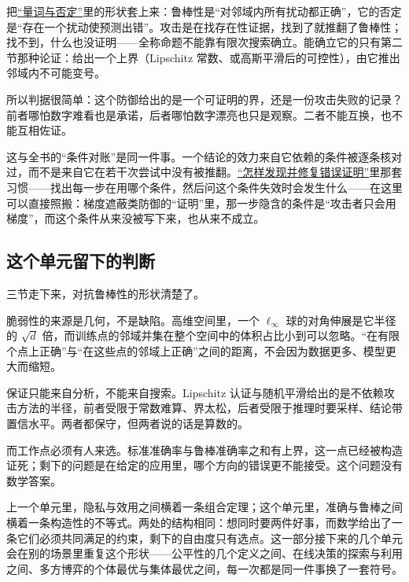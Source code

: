 \begin{proposition}[判断一个防御是否真实]
把\hyperref[sec:01-Mathematical-Language/01-Logic/03]{``量词与否定''}里的形状套上来：鲁棒性是``对邻域内所有扰动都正确''，它的否定是``存在一个扰动使预测出错''。攻击是在找存在性证据，找到了就推翻了鲁棒性；找不到，什么也没证明——全称命题不能靠有限次搜索确立。能确立它的只有第二节那种论证：给出一个上界（Lipschitz 常数、或高斯平滑后的可控性），由它推出邻域内不可能变号。
\end{proposition}

所以判据很简单：这个防御给出的是一个可证明的界，还是一份攻击失败的记录？前者哪怕数字难看也是承诺，后者哪怕数字漂亮也只是观察。二者不能互换，也不能互相佐证。

这与全书的``条件对账''是同一件事。一个结论的效力来自它依赖的条件被逐条核对过，而不是来自它在若干次尝试中没有被推翻。\hyperref[sec:01-Mathematical-Language/03-Proof-Techniques/04]{``怎样发现并修复错误证明''}里那套习惯——找出每一步在用哪个条件，然后问这个条件失效时会发生什么——在这里可以直接照搬：梯度遮蔽类防御的``证明''里，那一步隐含的条件是``攻击者只会用梯度''，而这个条件从来没被写下来，也从来不成立。

\subsection{这个单元留下的判断}

三节走下来，对抗鲁棒性的形状清楚了。

脆弱性的来源是几何，不是缺陷。高维空间里，一个 \(\ell_\infty\) 球的对角伸展是它半径的 \(\sqrt d\) 倍，而训练点的邻域并集在整个空间中的体积占比小到可以忽略。``在有限个点上正确''与``在这些点的邻域上正确''之间的距离，不会因为数据更多、模型更大而缩短。

保证只能来自分析，不能来自搜索。Lipschitz 认证与随机平滑给出的是不依赖攻击方法的半径，前者受限于常数难算、界太松，后者受限于推理时要采样、结论带置信水平。两者都保守，但两者说的话是算数的。

而工作点必须有人来选。标准准确率与鲁棒准确率之和有上界，这一点已经被构造证死；剩下的问题是在给定的应用里，哪个方向的错误更不能接受。这个问题没有数学答案。

上一个单元里，隐私与效用之间横着一条组合定理；这个单元里，准确与鲁棒之间横着一条构造性的不等式。两处的结构相同：想同时要两件好事，而数学给出了一条它们必须共同满足的约束，剩下的自由度只有选点。这一部分接下来的几个单元会在别的场景里重复这个形状——公平性的几个定义之间、在线决策的探索与利用之间、多方博弈的个体最优与集体最优之间，每一次都是同一件事换了一套符号。
